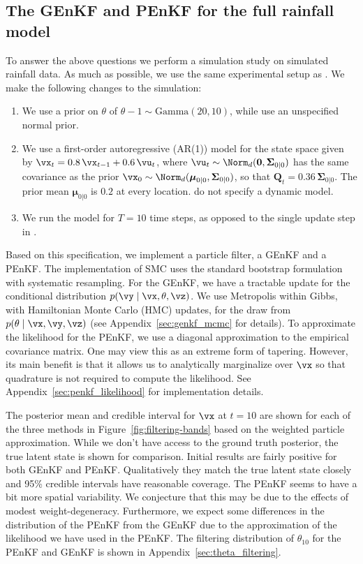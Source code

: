 \documentclass[12pt]{article}
\begin{document}
\subsection{The GEnKF and PEnKF for the full rainfall model}\label{sec:full}
To answer the above questions we perform a simulation study on simulated
rainfall data. As much as possible, we use the same experimental setup
as \cite{katzfuss2020}. We make the following changes to the simulation:
\begin{enumerate}
    \item We use a prior on $\theta$ of $\theta - 1 \sim \text{Gamma}(20, 10)$,
    while \cite{katzfuss2020} use an unspecified normal prior.
    \item We use a first-order autoregressive (AR(1)) model for the state space given by $\vx_t = 0.8\,\vx_{t-1} + 0.6\,\vu_t$,
    where $\vu_t \sim \Norm_d(\mathbf 0, \mathbf\Sigma_{0|0})$ has the same covariance
    as the prior $\vx_0 \sim \Norm_d(\boldsymbol\mu_{0|0}, \mathbf\Sigma_{0|0})$, so that
    $\mathbf Q_t = 0.36\,\mathbf\Sigma_{0|0}$. The prior mean $\boldsymbol\mu_{0|0}$ is $0.2$ at
    every location.
    \cite{katzfuss2020} do not specify
    a dynamic model.
    \item We run the model for $T=10$ time steps, as opposed to the single
    update step in \cite{katzfuss2020}.
\end{enumerate}
Based on this specification, we implement a particle filter, a
GEnKF and a PEnKF. The implementation of SMC uses the standard bootstrap
formulation with systematic resampling. For the GEnKF, we have a tractable
update for the conditional distribution $p(\vy \mid \vx, \theta, \vz)$.
We use Metropolis within Gibbs, with Hamiltonian Monte Carlo (HMC) \cite{duane1987,neal2011} updates, for the draw from $p(\theta \mid \vx, \vy, \vz)$
(see Appendix~\ref{sec:genkf_mcmc} for details). To approximate the likelihood
for the PEnKF, we use a diagonal approximation to the empirical covariance
matrix. One may view this as an extreme form of tapering. However, its main
benefit is that it allows us to analytically marginalize over $\vx$ so that
quadrature is not required to compute the likelihood.
See Appendix~\ref{sec:penkf_likelihood} for implementation details.

The posterior mean and credible interval for $\vx$ at $t=10$ are shown for each
of the three methods in Figure~\ref{fig:filtering-bands} based on the weighted
particle approximation. While we don't have access to the ground truth
posterior, the true latent state is shown for comparison. Initial results
are fairly positive for both GEnKF and PEnKF. Qualitatively they match the
true latent state closely and 95\% credible intervals have reasonable coverage.
The PEnKF seems to have a bit more spatial variability. We conjecture that this
may be due to the effects of modest weight-degeneracy. Furthermore,
we expect some differences in the distribution of the PEnKF from the GEnKF
due to the approximation of the likelihood we have used in the PEnKF. The
filtering distribution of $\theta_{10}$ for the PEnKF and GEnKF is shown in
Appendix~\ref{sec:theta_filtering}.
\end{document}

